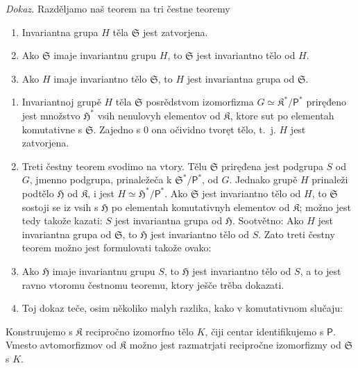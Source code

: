 \documentclass[11pt]{article}
\begin{document}
\emph{Dokaz.} Razděljamo naš teorem na tri čestne teoremy
\begin{enumerate}
\item Invariantna grupa \(H\) těla \(\mathfrak S\) jest zatvorjena.
\item Ako \(\mathfrak S\) imaje invariantnu grupu \(H\), to \(\mathfrak S\) jest invariantno tělo od \(H\).
\item Ako \(H\) imaje invariantno tělo \(\mathfrak S\), to \(H\) jest invariantna grupa od \(\mathfrak S\).
\end{enumerate}

\begin{enumerate}
\item Invariantnoj grupě \(H\) těla \(\mathfrak S\) posrědstvom izomorfizma \(G\simeq \mathfrak K^*/\mathsf P^*\) priręđeno jest množstvo \(\mathfrak H^*\) vsih nenulovyh elementov od \(\mathfrak K\), ktore sut po elementah komutativne s \(\mathfrak S\). Zajedno s 0 ona očividno tvoręt tělo, t.~j. \(H\) jest zatvorjena.

\item Treti čestny teorem svodimo na vtory. Tělu \(\mathfrak S\) priręđena jest podgrupa \(S\) od \(G\), jmenno podgrupa, prinaležeča k \(\mathfrak S^*/\mathsf P^*\), od \(G\). Jednako grupě \(H\) prinaleži podtělo \(\mathfrak H\) od \(\mathfrak K\), i jest \(H\simeq \mathfrak H^*/\mathsf P^*\). Ako \(\mathfrak S\) jest invariantno tělo od \(H\), to \(\mathfrak S\) sostoji se iz vsih s \(\mathfrak H\) po elementah komutativnyh elementov od \(\mathfrak K\); možno jest tedy takože kazati: \(S\) jest invariantna grupa od \(\mathfrak H\). Sootvětno: Ako \(H\) jest invariantna grupa od \(\mathfrak S\), to \(\mathfrak H\) jest invariantno tělo od \(S\). Zato treti čestny teorem možno jest formulovati takože ovako:

\item[\(3'\).] Ako \(\mathfrak H\) imaje invariantnu grupu \(S\), to \(\mathfrak H\) jest invariantno tělo od \(S\), a to jest ravno vtoromu čestnomu teoremu, ktory ješče trěba dokazati.

\item[3.] Toj dokaz teče, osim několiko malyh razlika, kako v komutativnom slučaju:
\end{enumerate}

Konstruujemo s \(\mathfrak K\) recipročno izomorfno tělo \(K\), čiji centar identifikujemo s \(\mathsf P\). Vmesto avtomorfizmov od \(\mathfrak K\) možno jest razmatrjati recipročne izomorfizmy od \(\mathfrak S\) s \(K\).
\end{document}
